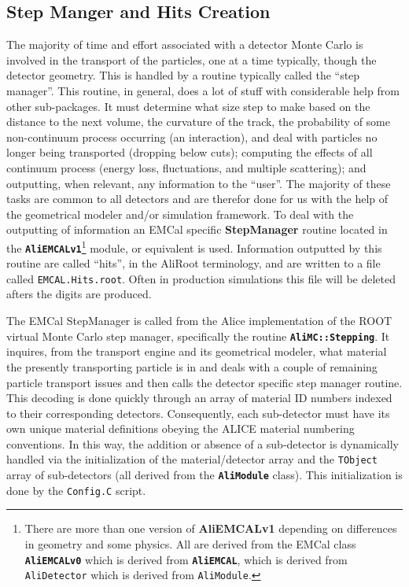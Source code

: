 %   
%
%
%
\subsection{Step Manger and Hits Creation}
The majority of time and effort associated with a detector Monte Carlo
is involved in the transport of the particles, one at a time typically,
though the detector geometry. This is handled by a routine typically called
the ``step manager''. This routine, in general, does a lot of stuff with 
considerable help from other sub-packages. It must determine what size
step to make based on the distance to the next volume, the curvature of the
track, the probability of some non-continuum process occurring (an 
interaction), and deal with particles no longer being transported 
(dropping below cuts); computing the effects of all continuum process 
(energy loss, fluctuations, and multiple scattering); and outputting, 
when relevant, any information to the ``user''. The majority of these 
tasks are common to all detectors and are therefor done for us 
with the help of the geometrical modeler and/or simulation framework. 
To deal with 
the outputting of information an EMCal specific {\bf StepManager} routine 
located in the \texttt{\bf AliEMCALv1}\footnote{There are more than one 
version of {\bf AliEMCALv1} depending on differences in geometry and 
some physics. All are derived from the EMCal class \texttt{\bf AliEMCALv0} 
which is derived from \texttt{\bf AliEMCAL}, which is derived from 
\texttt{AliDetector} which is derived from \texttt{AliModule}.} module, 
or equivalent is used. Information outputted by this routine are 
called ``hits'', in the AliRoot terminology, and are written to a
file called \texttt{EMCAL.Hits.root}. Often in production simulations 
this file will be deleted afters the digits are produced.

The EMCal StepManager is called from the Alice implementation of the
ROOT virtual Monte Carlo step manager, specifically the routine 
\texttt{\bf AliMC::Stepping}. It inquires, from the transport engine and its 
geometrical modeler,  what material the presently transporting particle 
is in and deals with a couple of remaining particle transport issues 
and then calls the detector specific step manager routine. This decoding 
is done quickly through an array of material ID numbers indexed to 
their corresponding detectors. Consequently, each sub-detector must 
have its own unique material definitions obeying the ALICE material 
numbering conventions. In this way, the addition or absence of a 
sub-detector is dynamically handled via the initialization of the 
material/detector array and the \texttt{TObject} array of sub-detectors 
(all derived from the \texttt{\bf AliModule} class). This initialization
is done by the \texttt{Config.C} script.

